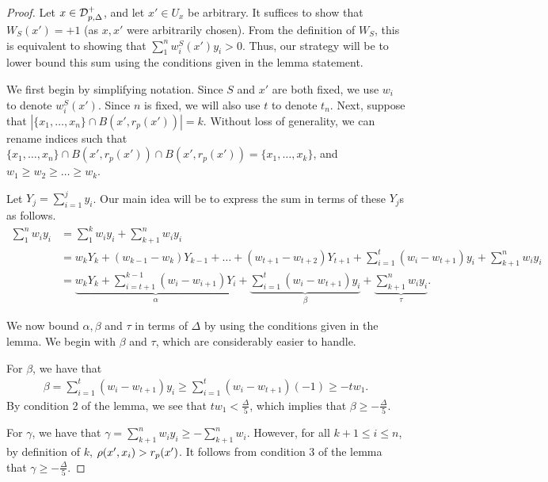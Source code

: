 \begin{proof}
Let $x \in {\mathcal D}_{p, \Delta}^+$, and let $x' \in U_x$ be arbitrary. It suffices to show that $W_S(x') = +1$ (as $x, x'$ were arbitrarily chosen). From the definition of $W_S$, this is equivalent to showing that $\sum_1^n w_i^S(x')y_i > 0.$ Thus, our strategy will be to lower bound this sum using the conditions given in the lemma statement. 

We first begin by simplifying notation. Since $S$ and $x'$ are both fixed, we use $w_i$ to denote $w_i^S(x')$. Since $n$ is fixed, we will also use $t$ to denote $t_n$. Next, suppose that $|\{x_1, \dots, x_n\} \cap B(x', r_p(x'))| = k$. Without loss of generality, we can rename indices such that $\{x_1, \dots, x_n\} \cap B(x', r_p(x')) \cap B(x', r_p(x')) = \{x_1, \dots, x_k\}$, and $w_1 \geq w_2 \geq \dots \geq w_k.$ 

Let $Y_j = \sum_{i=1}^j y_i$. Our main idea will be to express the sum in terms of these $Y_j$s as follows.  
\begin{equation*}
\begin{split}
\sum_1^n w_iy_i &= \sum_1^k w_iy_i + \sum_{k+1}^n w_iy_i \\
&= w_kY_k + (w_{k-1} - w_k)Y_{k-1} + \dots + (w_{t+1} -w_{t+2})Y_{t+1} + \sum_{i = 1}^t (w_i - w_{t+1})y_i + \sum_{k+1}^n w_iy_i \\
&= \underbrace{w_kY_k + \sum_{i = t+1}^{k-1} (w_i - w_{i+1})Y_i}_{\alpha} + \underbrace{\sum_{i = 1}^t (w_i - w_{t+1})y_i}_\beta + \underbrace{\sum_{k+1}^n w_iy_i}_\tau. 
\end{split}
\end{equation*}

We now bound $\alpha, \beta$ and $\tau$ in terms of $\Delta$ by using the conditions given in the lemma. We begin with $\beta$ and $\tau$, which are considerably easier to handle.

For $\beta$, we have that 
\begin{equation*}
\begin{split}
\beta = \sum_{i=1}^t (w_i - w_{t+1})y_i \geq \sum_{i=1}^t (w_i - w_{t+1})(-1) \geq -tw_1. 
\end{split}
\end{equation*}
By condition 2 of the lemma, we see that $tw_1 < \frac{\Delta}{5}$, which implies that $\beta \geq  -\frac{\Delta}{5}$.

For $\gamma$, we have that $\gamma = \sum_{k+1}^n w_iy_i \geq -\sum_{k+1}^n w_i$. However, for all $k+1 \leq i \leq n$, by definition of $k$, $\rho(x', x_i) > r_p(x')$. It follows from condition 3 of the lemma that $\gamma \geq -\frac{\Delta}{5}$.


\end{proof}
